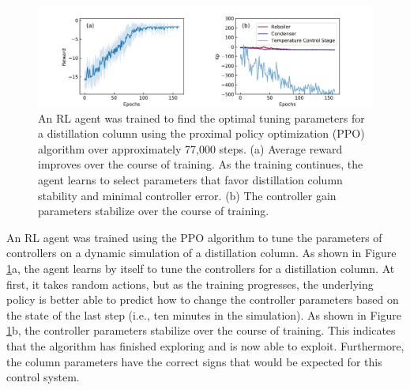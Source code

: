 \begin{figure}[tb]
  \includegraphics[width=\textwidth]{gfx/Chapter05/dis3_74_reward_parameters.png}
  \caption{An RL agent was trained to find the optimal tuning parameters for a distillation column using the proximal policy optimization (PPO) algorithm over approximately 77,000 steps. (a) Average reward improves over the course of training. As the training continues, the agent learns to select parameters that favor distillation column stability and minimal controller error. (b) The controller gain parameters stabilize over the course of training.}
  \label{ppo_training_curve}
\end{figure}

An RL agent was trained using the PPO algorithm to tune the parameters of controllers on a dynamic simulation of a distillation column. As shown in Figure \ref{ppo_training_curve}a, the agent learns by itself to tune the controllers for a distillation column. At first, it takes random actions, but as the training progresses, the underlying policy is better able to predict how to change the controller parameters based on the state of the last step (i.e., ten minutes in the simulation). As shown in Figure \ref{ppo_training_curve}b, the controller parameters stabilize over the course of training. This indicates that the algorithm has finished exploring and is now able to exploit. Furthermore, the column parameters have the correct signs that would be expected for this control system.


